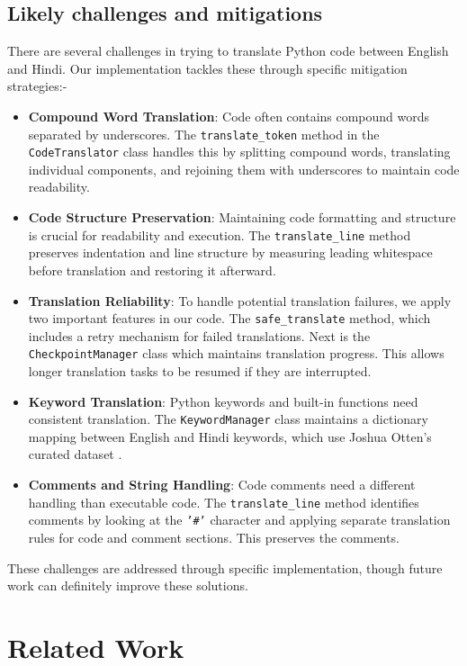 \documentclass[11pt,a4paper]{article}
\begin{document}
            \subsection{Likely challenges and mitigations} 
            There are several challenges in trying to translate Python code between English and Hindi. Our implementation tackles these through specific mitigation strategies:-
            \begin{itemize}[itemsep=0pt, topsep=0pt]
              \item \textbf{Compound Word Translation}: Code often contains compound words separated by underscores. The \texttt{translate\_token} method in the \texttt{CodeTranslator} class handles this by splitting compound words, translating individual components, and rejoining them with underscores to maintain code readability.
              \item \textbf{Code Structure Preservation}: Maintaining code formatting and structure is crucial for readability and execution. The \texttt{translate\_line} method preserves indentation and line structure by measuring leading whitespace before translation and restoring it afterward.
              \item \textbf{Translation Reliability}: To handle potential translation failures, we apply two important features in our code. The \texttt{safe\_translate} method, which includes a retry mechanism for failed translations. Next is the \texttt{CheckpointManager} class which maintains translation progress. This allows longer translation tasks to be resumed if they are interrupted.
              \item \textbf{Keyword Translation}: Python keywords and built-in functions need consistent translation. The \texttt{KeywordManager} class maintains a dictionary mapping between English and Hindi keywords, which use Joshua Otten's curated dataset \cite{otten2021unipy}.
              \item \textbf{Comments and String Handling}: Code comments need a different handling than executable code. The \texttt{translate\_line} method identifies comments by looking at the \texttt{'\#'} character and applying separate translation rules for code and comment sections. This preserves the comments. 
            \end{itemize}
            These challenges are addressed through specific implementation, though future work can definitely improve these solutions.

\section{Related Work}
\end{document}
